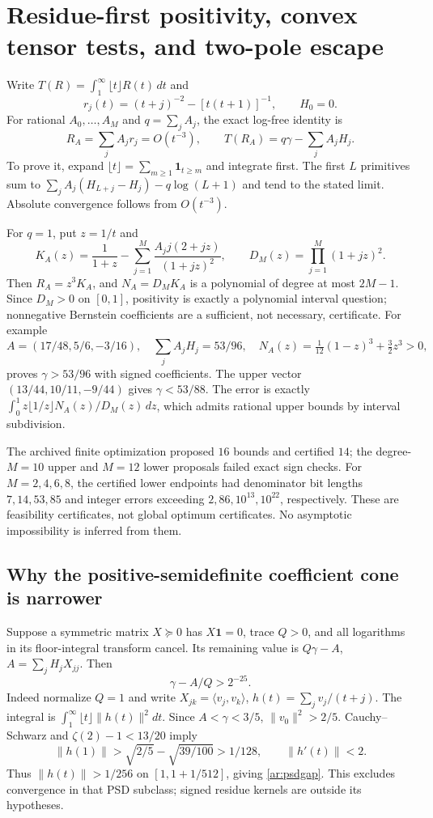 \documentclass[11pt,a4paper]{article}
\theoremstyle{definition}
\theoremstyle{remark}
\numberwithin{equation}{section}
\begin{document}
\section{Residue-first positivity, convex tensor tests, and two-pole escape}
\label{ar:residue}
Write $T(R)=\int_1^\infty\lfloor t\rfloor R(t)\,dt$ and
\[
 r_j(t)=(t+j)^{-2}-[t(t+1)]^{-1},\qquad H_0=0.
\]
For rational $A_0,\ldots,A_M$ and $q=\sum_jA_j$, the exact log-free
identity is
\begin{equation}\label{ar:residueidentity}
 R_A=\sum_jA_jr_j=O(t^{-3}),\qquad
 T(R_A)=q\gamma-\sum_jA_jH_j.
\end{equation}
To prove it, expand $\lfloor t\rfloor=\sum_{m\ge1}\mathbf1_{t\ge m}$
and integrate first.  The first $L$ primitives sum to
$\sum_jA_j(H_{L+j}-H_j)-q\log(L+1)$ and tend to the stated limit.
Absolute convergence follows from $O(t^{-3})$.

For $q=1$, put $z=1/t$ and
\[
 K_A(z)=\frac1{1+z}-\sum_{j=1}^M\frac{A_jj(2+jz)}{(1+jz)^2},
 \qquad D_M(z)=\prod_{j=1}^M(1+jz)^2.
\]
Then $R_A=z^3K_A$, and $N_A=D_MK_A$ is a polynomial of degree at most
$2M-1$.  Since $D_M>0$ on $[0,1]$, positivity is exactly a polynomial
interval question; nonnegative Bernstein coefficients are a sufficient,
not necessary, certificate.  For example
\[
 A=(17/48,5/6,-3/16),\quad
 \sum_jA_jH_j=53/96,\quad
 N_A(z)=\tfrac1{12}(1-z)^3+\tfrac32z^3>0,
\]
proves $\gamma>53/96$ with signed coefficients.  The upper vector
$(13/44,10/11,-9/44)$ gives $\gamma<53/88$.
The error is exactly
$\int_0^1z\lfloor1/z\rfloor N_A(z)/D_M(z)\,dz$, which admits rational
upper bounds by interval subdivision.

The archived finite optimization proposed $16$ bounds and certified $14$;
the degree-$M=10$ upper and $M=12$ lower proposals failed exact sign checks.
For $M=2,4,6,8$, the certified lower endpoints had denominator bit lengths
$7,14,53,85$ and integer errors exceeding $2,86,10^{13},10^{22}$,
respectively.  These are feasibility certificates, not global optimum
certificates.  No asymptotic impossibility is inferred from them.

\subsection{Why the positive-semidefinite coefficient cone is narrower}
Suppose a symmetric matrix $X\succeq0$ has $X\mathbf1=0$, trace $Q>0$,
and all logarithms in its floor-integral transform cancel.  Its remaining
value is $Q\gamma-A$, $A=\sum_jH_jX_{jj}$.  Then
\begin{equation}\label{ar:psdgap}
 \gamma-A/Q>2^{-25}.
\end{equation}
Indeed normalize $Q=1$ and write $X_{jk}=\langle v_j,v_k\rangle$,
$h(t)=\sum_jv_j/(t+j)$.  The integral is $\int_1^\infty\lfloor t\rfloor
\|h(t)\|^2dt$.  Since $A<\gamma<3/5$, $\|v_0\|^2>2/5$.
Cauchy--Schwarz and $\zeta(2)-1<13/20$ imply
\[
 \|h(1)\|>\sqrt{2/5}-\sqrt{39/100}>1/128,
 \qquad \|h'(t)\|<2.
\]
Thus $\|h(t)\|>1/256$ on $[1,1+1/512]$, giving \eqref{ar:psdgap}.
This excludes convergence in that PSD subclass; signed residue kernels
are outside its hypotheses.
\end{document}
